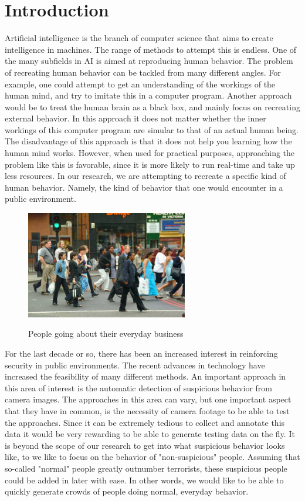 \documentclass[11pt]{book}
\begin{document}
\chapter{Introduction}
Artificial intelligence is the branch of computer science that aims to create intelligence in machines. The range of methods to attempt this is endless. One of the many subfields in AI is aimed at reproducing human behavior. The problem of recreating human behavior can be tackled from many different angles. For example, one could attempt to get an understanding of the workings of the human mind, and try to imitate this in a computer program. Another approach would be to treat the human brain as a black box, and mainly focus on recreating external behavior. In this approach it does not matter whether the inner workings of this computer program are simular to that of an actual human being. The disadvantage of this approach is that it does not help you learning how the human mind works. However, when used for practical purposes, approaching the problem like this is favorable, since it is more likely to run real-time and take up less resources. In our research, we are attempting to recreate a specific kind of human behavior. Namely, the kind of behavior that one would encounter in a public environment.\\
\begin{figure}[h]
\begin{center}
\includegraphics[width=200pt]{pedestrians.jpg}
\label{pedestrianpicture}
\end{center}
\caption{People going about their everyday business}
\end{figure}
For the last decade or so, there has been an increased interest in reinforcing security in public environments. The recent advances in technology have increased the feasibility of many different methods. An important approach in this area of interest is the automatic detection of suspicious behavior from camera images. The approaches in this area can vary, but one important aspect that they have in common, is the necessity of camera footage to be able to test the approaches. Since it can be extremely tedious to collect and annotate this data it would be very rewarding to be able to generate testing data on the fly. It is beyond the scope of our research to get into what suspicious behavior looks like, to we like to focus on the behavior of "non-suspicious" people. Assuming that so-called "normal" people greatly outnumber terrorists, these suspicious people could be added in later with ease. In other words, we would like to be able to quickly generate crowds of people doing normal, everyday behavior.\\
\end{document}
